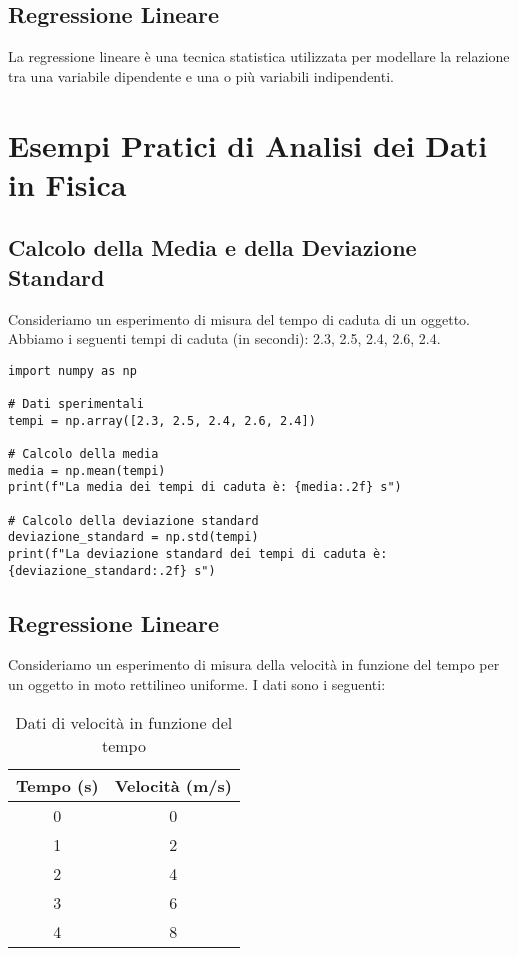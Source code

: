 \documentclass[12pt]{article}
\begin{document}
\subsection{Regressione Lineare}
La regressione lineare è una tecnica statistica utilizzata per modellare la relazione tra una variabile dipendente e una o più variabili indipendenti.

\section{Esempi Pratici di Analisi dei Dati in Fisica}

\subsection{Calcolo della Media e della Deviazione Standard}
Consideriamo un esperimento di misura del tempo di caduta di un oggetto. Abbiamo i seguenti tempi di caduta (in secondi): 2.3, 2.5, 2.4, 2.6, 2.4.

\begin{verbatim}
import numpy as np

# Dati sperimentali
tempi = np.array([2.3, 2.5, 2.4, 2.6, 2.4])

# Calcolo della media
media = np.mean(tempi)
print(f"La media dei tempi di caduta è: {media:.2f} s")

# Calcolo della deviazione standard
deviazione_standard = np.std(tempi)
print(f"La deviazione standard dei tempi di caduta è: {deviazione_standard:.2f} s")
\end{verbatim}

\subsection{Regressione Lineare}
Consideriamo un esperimento di misura della velocità in funzione del tempo per un oggetto in moto rettilineo uniforme. I dati sono i seguenti:

\begin{table}[h!]
    \centering
    \begin{tabular}{|c|c|}
        \hline
        Tempo (s) & Velocità (m/s) \\
        \hline
        0 & 0 \\
        1 & 2 \\
        2 & 4 \\
        3 & 6 \\
        4 & 8 \\
        \hline
    \end{tabular}
    \caption{Dati di velocità in funzione del tempo}
    \label{tab:dati_velocita}
\end{table}
\newpage
\end{document}
